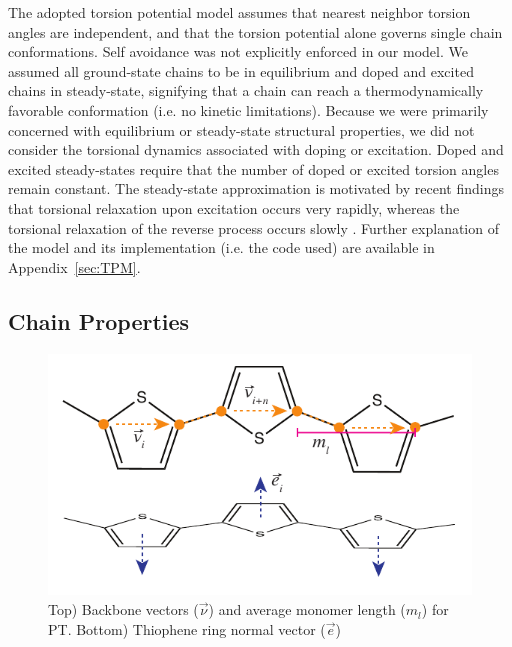 The adopted torsion potential model assumes that nearest neighbor torsion angles are independent, and that the torsion potential alone governs single chain conformations. Self avoidance was not explicitly enforced in our model. We assumed all ground-state chains to be in equilibrium and doped and excited chains in steady-state, signifying that a chain can reach a thermodynamically favorable conformation (i.e. no kinetic limitations). Because we were primarily concerned with equilibrium or steady-state structural properties, we did not consider the torsional dynamics associated with doping or excitation. Doped and excited steady-states require that the number of doped or excited torsion angles remain constant. The steady-state approximation is motivated by recent findings that torsional relaxation upon excitation occurs very rapidly, whereas the torsional relaxation of the reverse process occurs slowly \cite{Busby2011, Yu2016}. Further explanation of the model and its implementation (i.e. the code used) are available in Appendix~\ref{sec:TPM}.

\subsection{Chain Properties}

\begin{figure}
    \centering
    \includegraphics{figures/chap2/bond_vectors.pdf}
    \caption[Backbone Vector, Average Monomer Length, and Ring Normal Vector for PT]{Top) Backbone vectors ($\Vec{\nu}$) and average monomer length ($m_l$) for PT. Bottom) Thiophene ring normal vector ($\Vec{e}$)}
    \label{fig:pt_vecs}
\end{figure}

